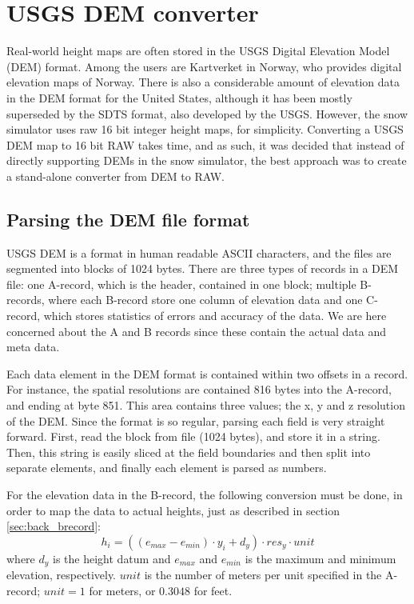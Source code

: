 \section{USGS DEM converter}
Real-world height maps are often stored in the USGS Digital Elevation Model (DEM) format. Among the users are Kartverket in Norway, who provides digital elevation maps of Norway. There is also a considerable amount of elevation data in the DEM format for the United States, although it has been mostly superseded by the SDTS format, also developed by the USGS\cite{wiki_usgsdem}. However, the snow simulator uses raw 16 bit integer height maps, for simplicity. Converting a USGS DEM map to 16 bit RAW takes time, and as such, it was decided that instead of directly supporting DEMs in the snow simulator, the best approach was to create a stand-alone converter from DEM to RAW.


\subsection{Parsing the DEM file format}
USGS DEM is a format in human readable ASCII characters, and the files are segmented into blocks of 1024 bytes. There are three types of records in a DEM file: one A-record, which is the header, contained in one block; multiple B-records, where each B-record store one column of elevation data and one C-record, which stores statistics of errors and accuracy of the data. We are here concerned about the A and B records since these contain the actual data and meta data. 

Each data element in the DEM format is contained within two offsets in a record. For instance, the spatial resolutions are contained 816 bytes into the A-record, and ending at byte 851. This area contains three values; the x, y and z resolution of the DEM. Since the format is so regular, parsing each field is very straight forward. First, read the block from file (1024 bytes), and store it in a string. Then, this string is easily sliced at the field boundaries and then split into separate elements, and finally each element is parsed as numbers.

For the elevation data in the B-record, the following conversion must be done, in order to map the data to actual heights, just as described in section \ref{sec:back_brecord}:
$$
h_i = ((e_{max}-e_{min})\cdot y_i+ d_y)\cdot res_y \cdot unit
$$
where $d_y$ is the height datum and $e_{max}$ and $e_{min}$ is the maximum and minimum elevation, respectively. $unit$ is the number of meters per unit specified in the A-record; $unit=1$ for meters, or $0.3048$ for feet.

